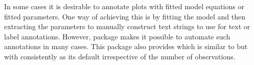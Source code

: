 \documentclass[krantz2]{krantz}\usepackage{knitr}
\begin{document}
\begin{knitrout}\footnotesize
{}\color{fgcolor}\begin{kframe}
\begin{alltt}
\hlstd{(} 
        \hlstd{=}    \hlopt{+}
  \hlstd{()} \hlopt{+}
  \hlstd{(} \hlstd{=} \hlstd{,}
               \hlstd{=} \hlstd{(}  \hlopt{~}  \hlopt{*}  \hlopt{/}  \hlopt{+} 
                                  \hlstd{=} \hlstd{(} \hlstd{=} \hlstd{,}  \hlstd{=} \hlstd{)),}
               \hlstd{=} \hlstd{)}
\end{alltt}
\end{kframe}
\end{knitrout}

In some cases it is desirable to annotate plots with fitted model equations or fitted parameters. One way of achieving this is by fitting the model and then extracting the parameters to manually construct text strings to use for text or label annotations. However, package  makes it possible to automate such annotations in many cases. This package also provides  which is similar to  but with  consistently as its default irrespective of the number of observations.
\end{document}
